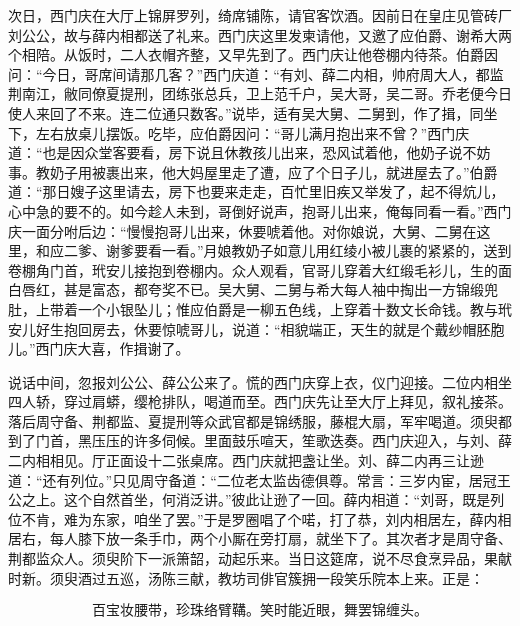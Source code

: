 次日，西门庆在大厅上锦屏罗列，绮席铺陈，请官客饮酒。因前日在皇庄见管砖厂刘公公，故与薛内相都送了礼来。西门庆这里发柬请他，又邀了应伯爵、谢希大两个相陪。从饭时，二人衣帽齐整，又早先到了。西门庆让他卷棚内待茶。伯爵因问：“今日，哥席间请那几客？”西门庆道：“有刘、薛二内相，帅府周大人，都监荆南江，敝同僚夏提刑，团练张总兵，卫上范千户，吴大哥，吴二哥。乔老便今日使人来回了不来。连二位通只数客。”说毕，适有吴大舅、二舅到，作了揖，同坐下，左右放桌儿摆饭。吃毕，应伯爵因问：“哥儿满月抱出来不曾？”西门庆道：“也是因众堂客要看，房下说且休教孩儿出来，恐风试着他，他奶子说不妨事。教奶子用被裹出来，他大妈屋里走了遭，应了个日子儿，就进屋去了。”伯爵道：“那日嫂子这里请去，房下也要来走走，百忙里旧疾又举发了，起不得炕儿，心中急的要不的。如今趁人未到，哥倒好说声，抱哥儿出来，俺每同看一看。”西门庆一面分咐后边：“慢慢抱哥儿出来，休要唬着他。对你娘说，大舅、二舅在这里，和应二爹、谢爹要看一看。”月娘教奶子如意儿用红绫小被儿裹的紧紧的，送到卷棚角门首，玳安儿接抱到卷棚内。众人观看，官哥儿穿着大红缎毛衫儿，生的面白唇红，甚是富态，都夸奖不已。吴大舅、二舅与希大每人袖中掏出一方锦缎兜肚，上带着一个小银坠儿；惟应伯爵是一柳五色线，上穿着十数文长命钱。教与玳安儿好生抱回房去，休要惊唬哥儿，说道：“相貌端正，天生的就是个戴纱帽胚胞儿。”西门庆大喜，作揖谢了。

说话中间，忽报刘公公、薛公公来了。慌的西门庆穿上衣，仪门迎接。二位内相坐四人轿，穿过肩蟒，缨枪排队，喝道而至。西门庆先让至大厅上拜见，叙礼接茶。落后周守备、荆都监、夏提刑等众武官都是锦绣服，藤棍大扇，军牢喝道。须臾都到了门首，黑压压的许多伺候。里面鼓乐喧天，笙歌迭奏。西门庆迎入，与刘、薛二内相相见。厅正面设十二张桌席。西门庆就把盏让坐。刘、薛二内再三让逊道：“还有列位。”只见周守备道：“二位老太监齿德俱尊。常言：三岁内宦，居冠王公之上。这个自然首坐，何消泛讲。”彼此让逊了一回。薛内相道：“刘哥，既是列位不肯，难为东家，咱坐了罢。”于是罗圈唱了个喏，打了恭，刘内相居左，薛内相居右，每人膝下放一条手巾，两个小厮在旁打扇，就坐下了。其次者才是周守备、荆都监众人。须臾阶下一派箫韶，动起乐来。当日这筵席，说不尽食烹异品，果献时新。须臾酒过五巡，汤陈三献，教坊司俳官簇拥一段笑乐院本上来。正是：

\[
百宝妆腰带，珍珠络臂鞲。
笑时能近眼，舞罢锦缠头。
\]

